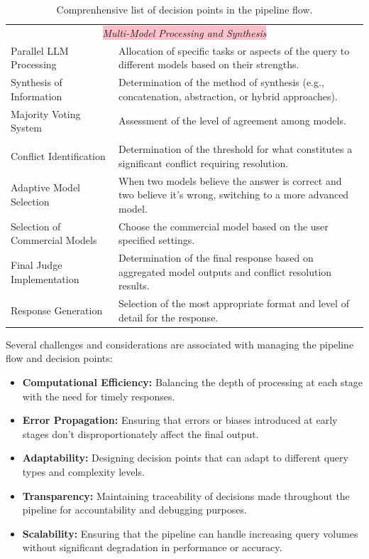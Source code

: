 \begin{table}[ht!]
{\begin{tabular}{lp{11cm}}
            \multicolumn{2}{c}{\colorbox{pink}{\textit{Multi-Model Processing and Synthesis}}} \\
            Parallel LLM Processing & Allocation of specific tasks or aspects of the query to different models based on their strengths. \\
            Synthesis of Information & Determination of the method of synthesis (e.g., concatenation, abstraction, or hybrid approaches). \\
            Majority Voting System & Assessment of the level of agreement among models. \\
            \hdashline
            \multicolumn{2}{c}{\colorbox{pink}{\textit{Conflict Resolution and Final Output Generation}}} \\
            Conflict Identification & Determination of the threshold for what constitutes a significant conflict requiring resolution. \\
            Adaptive Model Selection & When two models believe the answer is correct and two believe it's wrong, switching to a more advanced model. \\
            Selection of Commercial Models & Choose the commercial model based on the user specified settings. \\
            Final Judge Implementation & Determination of the final response based on aggregated model outputs and conflict resolution results. \\
            Response Generation & Selection of the most appropriate format and level of detail for the response. \\
            \bottomrule
        \end{tabular}}\caption{Comprenhensive list of decision points in the pipeline flow.}
    \label{tab:pipeline-decision-points}
\end{table}

Several challenges and considerations are associated with managing the pipeline flow and decision points:
\begin{itemize}
    \item \textbf{Computational Efficiency:} Balancing the depth of processing at each stage with the need for timely responses.
    \item \textbf{Error Propagation:} Ensuring that errors or biases introduced at early stages don't disproportionately affect the final output.
    \item \textbf{Adaptability:} Designing decision points that can adapt to different query types and complexity levels.
    \item \textbf{Transparency:} Maintaining traceability of decisions made throughout the pipeline for accountability and debugging purposes.
    \item \textbf{Scalability:} Ensuring that the pipeline can handle increasing query volumes without significant degradation in performance or accuracy.
\end{itemize}


